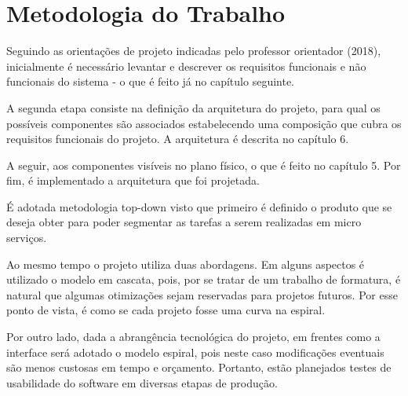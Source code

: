 \chapter{Metodologia do Trabalho}
Seguindo as orientações de projeto indicadas pelo professor orientador (2018), inicialmente é necessário levantar e descrever os requisitos funcionais e não funcionais do sistema - o que é feito já no capítulo seguinte.

A segunda etapa consiste na definição da arquitetura do projeto, para qual os possíveis componentes são associados estabelecendo uma composição que cubra os requisitos funcionais do projeto. A arquitetura é descrita no capítulo 6.

A seguir, aos componentes visíveis no plano físico, o que é feito no capítulo 5. Por fim, é implementado a arquitetura que foi projetada.

É adotada metodologia top-down visto que primeiro é definido o produto que se deseja obter para poder segmentar as tarefas a serem realizadas em micro serviços.

Ao mesmo tempo o projeto utiliza duas abordagens. Em alguns aspectos é utilizado o modelo em cascata, pois, por se tratar de um trabalho de formatura, é natural que algumas otimizações sejam reservadas para projetos futuros. Por esse ponto de vista, é como se cada projeto fosse uma curva na espiral.

Por outro lado, dada a abrangência tecnológica do projeto, em frentes como a interface será adotado o modelo espiral, pois neste caso modificações eventuais são menos custosas em tempo e orçamento. Portanto, estão planejados testes de usabilidade do software em diversas etapas de produção.
